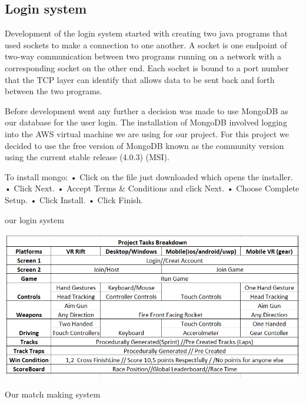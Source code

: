 \subsection {Login system}\newline
Development of the login system started with creating two java programs that used sockets to make a connection to one another. A socket is one endpoint of two-way communication between two programs running on a network with a corresponding socket on the other end. Each socket is bound to a port number that the TCP layer can identify that allows data to be sent back and forth between the two programs.\newline

Before development went any further a decision was made to use MongoDB as our database for the user login. The installation of MongoDB involved logging into the AWS virtual machine we are using for our project. For this project we decided to use the free version of MongoDB known as the community version using the current stable release (4.0.3) (MSI).\newline

To install mongo:\newline
•	Click on the file just downloaded which opens the installer.\newline
•	Click Next.\newline
•	Accept Terms & Conditions and click Next.\newline
•	Choose Complete Setup.\newline
•	Click Install.\newline
•	Click Finish.\newline


our login system

\includegraphics[width=1\columnwidth]{img/breakdown.PNG}

Our match making system

